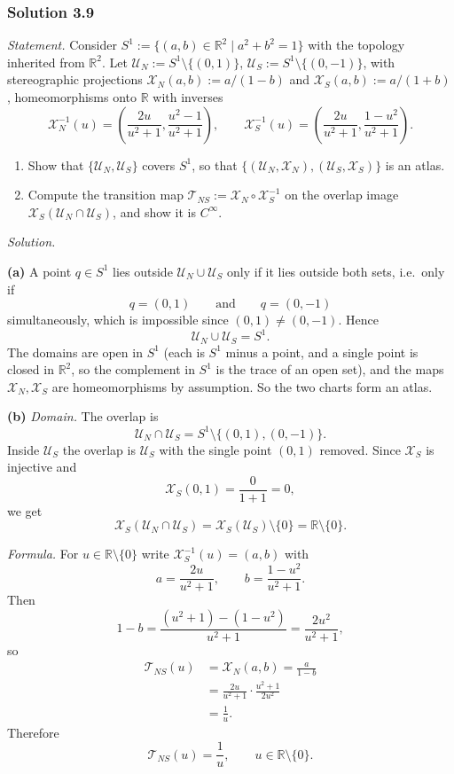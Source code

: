 \documentclass[11pt]{article}
\begin{document}
\subsubsection*{Solution 3.9}

\noindent\textit{Statement.} Consider $S^1:=\{(a,b)\in\mathbb R^2\mid a^2+b^2=1\}$ with the topology inherited from $\mathbb R^2$. Let $\mathcal U_N:=S^1\setminus\{(0,1)\}$, $\mathcal U_S:=S^1\setminus\{(0,-1)\}$, with stereographic projections $\mathcal X_N(a,b):=a/(1-b)$ and $\mathcal X_S(a,b):=a/(1+b)$, homeomorphisms onto $\mathbb R$ with inverses
\[
\mathcal X_N^{-1}(u)=\left(\frac{2u}{u^2+1},\frac{u^2-1}{u^2+1}\right),\qquad
\mathcal X_S^{-1}(u)=\left(\frac{2u}{u^2+1},\frac{1-u^2}{u^2+1}\right).
\]
\begin{enumerate}[label=(\alph*)]
  \item Show that $\{\mathcal U_N,\mathcal U_S\}$ covers $S^1$, so that $\{(\mathcal U_N,\mathcal X_N),(\mathcal U_S,\mathcal X_S)\}$ is an atlas.
  \item Compute the transition map $\mathcal T_{NS}:=\mathcal X_N\circ\mathcal X_S^{-1}$ on the overlap image $\mathcal X_S(\mathcal U_N\cap\mathcal U_S)$, and show it is $C^\infty$.
\end{enumerate}

\medskip
\noindent\textit{Solution.}

\textbf{(a)} A point $q\in S^1$ lies outside $\mathcal U_N\cup\mathcal U_S$ only if it lies outside both sets, i.e.\ only if
\[
q=(0,1)\qquad\text{and}\qquad q=(0,-1)
\]
simultaneously, which is impossible since $(0,1)\neq(0,-1)$. Hence
\[
\mathcal U_N\cup\mathcal U_S=S^1.
\]
The domains are open in $S^1$ (each is $S^1$ minus a point, and a single point is closed in $\mathbb R^2$, so the complement in $S^1$ is the trace of an open set), and the maps $\mathcal X_N,\mathcal X_S$ are homeomorphisms by assumption. So the two charts form an atlas.

\textbf{(b)} \emph{Domain.} The overlap is
\[
\mathcal U_N\cap\mathcal U_S=S^1\setminus\{(0,1),(0,-1)\}.
\]
Inside $\mathcal U_S$ the overlap is $\mathcal U_S$ with the single point $(0,1)$ removed. Since $\mathcal X_S$ is injective and
\[
\mathcal X_S(0,1)=\frac{0}{1+1}=0,
\]
we get
\[
\mathcal X_S(\mathcal U_N\cap\mathcal U_S)=\mathcal X_S(\mathcal U_S)\setminus\{0\}=\mathbb R\setminus\{0\}.
\]

\emph{Formula.} For $u\in\mathbb R\setminus\{0\}$ write $\mathcal X_S^{-1}(u)=(a,b)$ with
\[
a=\frac{2u}{u^2+1},\qquad b=\frac{1-u^2}{u^2+1}.
\]
Then
\[
1-b=\frac{(u^2+1)-(1-u^2)}{u^2+1}=\frac{2u^2}{u^2+1},
\]
so
\begin{align*}
\mathcal T_{NS}(u)
&=\mathcal X_N(a,b)=\frac{a}{1-b}\\
&=\frac{2u}{u^2+1}\cdot\frac{u^2+1}{2u^2}\\
&=\frac1u.
\end{align*}
Therefore
\[
\mathcal T_{NS}(u)=\frac1u,\qquad u\in\mathbb R\setminus\{0\}.
\]
\end{document}
